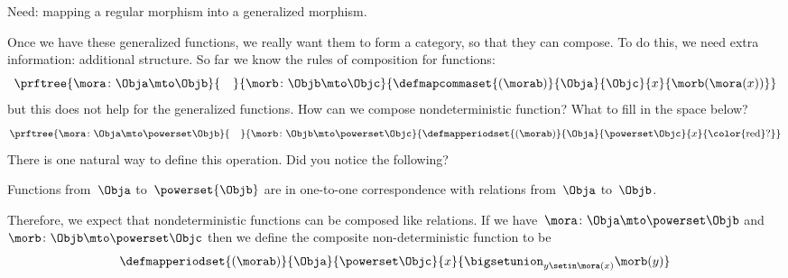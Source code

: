 Need: mapping a regular morphism into a generalized morphism.

Once we have these generalized functions, we really want them to form a category, so that they can compose.
To do this, we need extra information: additional structure.
So far we know the rules of composition for functions:
%
\begin{equation}
    \label{eq:monad-function-composition}
    \prftree{\mora\colon \Obja \mto \Objb}{\quad}{\morb\colon \Objb \mto \Objc}
    {
        \defmapcommaset{
            (\morab)
        }{
            \Obja
        }{
            \Objc
        }{
            x
        }{
            \morb(\mora(x))
        }
    }
\end{equation}
%
but this does not help for the generalized functions.
How can we compose nondeterministic function?
What to fill in the space below?
%
\begin{equation}
    \label{eq:monad-gen-function-composition}
    \prftree{
        \mora\colon \Obja \mto \powerset\Objb
    }{
        \quad
    }{
        \morb\colon \Objb \mto \powerset \Objc
    }{
        \defmapperiodset{(\morab)}{\Obja}{\powerset\Objc}%
        {x}{\text{\color{red}?}}
    }
\end{equation}
%
There is one natural way to define this operation.
Did you notice the following?

\begin{lemma}
    \label{lem:powersets-relations}
    Functions from~$\Obja$ to~$\powerset{\Objb}$ are in one-to-one correspondence with relations from~$\Obja$ to~$\Objb$.
\end{lemma}


Therefore, we expect that nondeterministic functions can be composed like relations.
If we have~$\mora\colon \Obja \mto \powerset\Objb$ and~$\morb\colon \Objb \mto \powerset \Objc$ then we define the composite non-deterministic function to be
%
\begin{equation}
    \label{eq:fish-nondet}
    \defmapperiodset{(\morab)}{\Obja}{\powerset\Objc}%
    {x}{ \displaystyle \bigsetunion_{y\setin \mora(x)}\morb(y)}
\end{equation}
%

